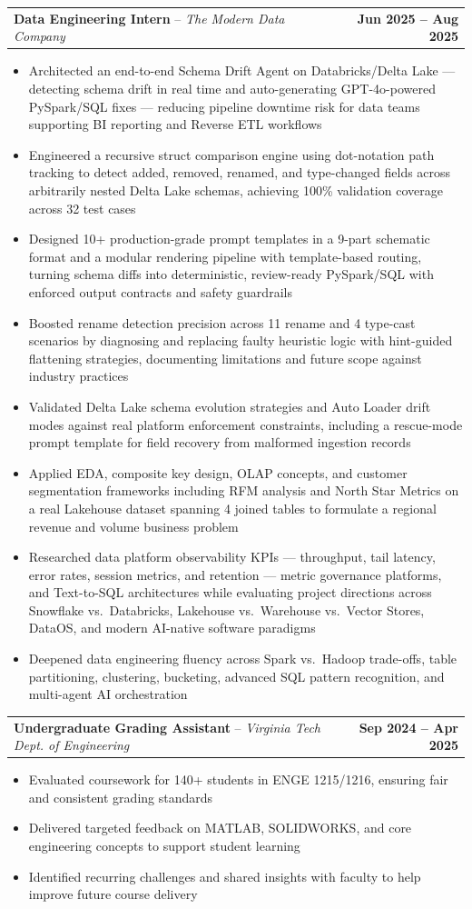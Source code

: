 \documentclass[letterpaper,11pt]{article}
\makeatletter
\newcommand{\resumeItem}[1]{
  \item\small{{#1 \vspace{-2pt}}}
}
\newcommand{\resumeSubheading}[4]{%
  \vspace{-2pt}\item
    \begin{tabular*}{1.0\textwidth}[t]{l@{\extracolsep{\fill}}r}
      \textbf{#1}{ -- }\textit{\small #3}%
      \ifthenelse{\equal{#4}{}}{}{, \textit{\small #4}}%
      & \textbf{\small #2} \\
    \end{tabular*}\vspace{-7pt}
}
\newcommand{\resumeItemListStart}{\begin{itemize}}
\newcommand{\resumeItemListEnd}{\end{itemize}\vspace{-5pt}}
\makeatother
\begin{document}
        \resumeSubheading
            {Data Engineering Intern}
            {Jun 2025 -- Aug 2025}
            {The Modern Data Company}
            {Palo Alto, CA (Remote)}
            \resumeItemListStart
                \resumeItem{Architected an end-to-end Schema Drift Agent on Databricks/Delta Lake — detecting schema drift in real time and auto-generating GPT-4o-powered PySpark/SQL fixes — reducing pipeline downtime risk for data teams supporting BI reporting and Reverse ETL workflows}
                \resumeItem{Engineered a recursive struct comparison engine using dot-notation path tracking to detect added, removed, renamed, and type-changed fields across arbitrarily nested Delta Lake schemas, achieving 100\% validation coverage across 32 test cases}
                \resumeItem{Designed 10+ production-grade prompt templates in a 9-part schematic format and a modular rendering pipeline with template-based routing, turning schema diffs into deterministic, review-ready PySpark/SQL with enforced output contracts and safety guardrails}
                \resumeItem{Boosted rename detection precision across 11 rename and 4 type-cast scenarios by diagnosing and replacing faulty heuristic logic with hint-guided flattening strategies, documenting limitations and future scope against industry practices}
                \resumeItem{Validated Delta Lake schema evolution strategies and Auto Loader drift modes against real platform enforcement constraints, including a rescue-mode prompt template for field recovery from malformed ingestion records}
                \resumeItem{Applied EDA, composite key design, OLAP concepts, and customer segmentation frameworks including RFM analysis and North Star Metrics on a real Lakehouse dataset spanning 4 joined tables to formulate a regional revenue and volume business problem}
                \resumeItem{Researched data platform observability KPIs — throughput, tail latency, error rates, session metrics, and retention — metric governance platforms, and Text-to-SQL architectures while evaluating project directions across Snowflake vs.\ Databricks, Lakehouse vs.\ Warehouse vs.\ Vector Stores, DataOS, and modern AI-native software paradigms}
                \resumeItem{Deepened data engineering fluency across Spark vs.\ Hadoop trade-offs, table partitioning, clustering, bucketing, advanced SQL pattern recognition, and multi-agent AI orchestration}
            \resumeItemListEnd

        \resumeSubheading
            {Undergraduate Grading Assistant}
            {Sep 2024 -- Apr 2025}
            {Virginia Tech Dept. of Engineering}
            {Blacksburg, VA}
            \resumeItemListStart
                \resumeItem{Evaluated coursework for 140+ students in ENGE 1215/1216, ensuring fair and consistent grading standards}
                \resumeItem{Delivered targeted feedback on MATLAB, SOLIDWORKS, and core engineering concepts to support student learning}
                \resumeItem{Identified recurring challenges and shared insights with faculty to help improve future course delivery}
            \resumeItemListEnd
\end{document}
